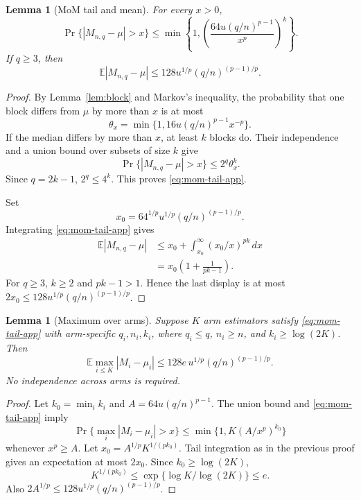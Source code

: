 \documentclass[twoside]{article}
\newtheorem{lemma}[theorem]{Lemma}
\newcommand{\E}{\mathbb E}
\begin{document}
\begin{lemma}[MoM tail and mean]
\label{lem:mom-full}
For every $x>0$,
\begin{equation}
 \Pr\{|M_{n,q}-\mu|>x\}
 \leq\min\left\{1,
 \left(\frac{64u(q/n)^{p-1}}{x^p}\right)^k\right\}.
 \label{eq:mom-tail-app}
\end{equation}
If $q\geq3$, then
\begin{equation}
 \E|M_{n,q}-\mu|
 \leq128u^{1/p}(q/n)^{(p-1)/p}.
 \label{eq:mom-mean-app}
\end{equation}
\end{lemma}

\begin{proof}
By Lemma~\ref{lem:block} and Markov's inequality, the probability that one
block differs from $\mu$ by more than $x$ is at most
\[
 \theta_x=\min\{1,16u(q/n)^{p-1}x^{-p}\}.
\]
If the median differs by more than $x$, at least $k$ blocks do. Their
independence and a union bound over subsets of size $k$ give
\[
 \Pr\{|M_{n,q}-\mu|>x\}
 \leq2^q\theta_x^k.
\]
Since $q=2k-1$, $2^q\leq4^k$. This proves
\eqref{eq:mom-tail-app}.

Set
\[
 x_0=64^{1/p}u^{1/p}(q/n)^{(p-1)/p}.
\]
Integrating \eqref{eq:mom-tail-app} gives
\begin{align*}
 \E|M_{n,q}-\mu|
 &\leq x_0+\int_{x_0}^\infty(x_0/x)^{pk}\,dx\\
 &=x_0\left(1+\frac1{pk-1}\right).
\end{align*}
For $q\geq3$, $k\geq2$ and $pk-1>1$. Hence the last display is at most
$2x_0\leq128u^{1/p}(q/n)^{(p-1)/p}$.
\end{proof}

\begin{lemma}[Maximum over arms]
\label{lem:max-full}
Suppose $K$ arm estimators satisfy \eqref{eq:mom-tail-app} with arm-specific
$q_i,n_i,k_i$, where $q_i\leq q$, $n_i\geq n$, and
$k_i\geq\log(2K)$. Then
\begin{equation}
 \E\max_{i\leq K}|M_i-\mu_i|
 \leq128e\,u^{1/p}(q/n)^{(p-1)/p}.
 \label{eq:max-app}
\end{equation}
No independence across arms is required.
\end{lemma}

\begin{proof}
Let $k_0=\min_i k_i$ and
$A=64u(q/n)^{p-1}$. The union bound and
\eqref{eq:mom-tail-app} imply
\[
 \Pr\{\max_i|M_i-\mu_i|>x\}
 \leq\min\{1,K(A/x^p)^{k_0}\}
\]
whenever $x^p\geq A$. Let
$x_0=A^{1/p}K^{1/(pk_0)}$. Tail integration as in the previous proof gives
an expectation at most $2x_0$. Since $k_0\geq\log(2K)$,
\[
 K^{1/(pk_0)}
 \leq\exp\{\log K/\log(2K)\}\leq e.
\]
Also $2A^{1/p}\leq128u^{1/p}(q/n)^{(p-1)/p}$.
\end{proof}
\end{document}
